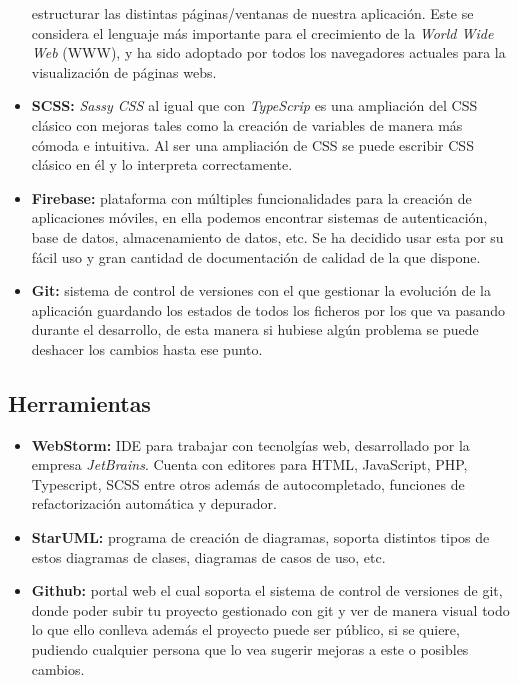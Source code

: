\begin{itemize}
    estructurar las distintas páginas/ventanas de nuestra aplicación. Este se considera el lenguaje
    más importante para el crecimiento de la \textit{World Wide Web} (WWW), y ha sido adoptado por
    todos los navegadores actuales para la visualización de páginas webs.
    \item\textbf{SCSS:} \textit{Sassy CSS} al igual que con \textit{TypeScrip} es una ampliación del
    CSS clásico con mejoras tales como la creación de variables de manera más cómoda e intuitiva.
    Al ser una ampliación de CSS se puede escribir CSS clásico en él y lo interpreta correctamente.
    \item\textbf{Firebase:} plataforma con múltiples funcionalidades para la creación de aplicaciones
    móviles, en ella podemos encontrar sistemas de autenticación, base de datos, almacenamiento de
    datos, etc. Se ha decidido usar esta por su fácil uso y gran cantidad de documentación de calidad
    de la que dispone.
    \item\textbf{Git:} sistema de control de versiones con el que gestionar la evolución de la
    aplicación guardando los estados de todos los ficheros por los que va pasando durante el
    desarrollo, de esta manera si hubiese algún problema se puede deshacer los cambios hasta ese
    punto.
\end{itemize}

\subsection{Herramientas}
\begin{itemize}
    \item\textbf{WebStorm:} IDE para trabajar con tecnolgías web, desarrollado por la empresa
    \textit{JetBrains}\cite{jetbrains}. Cuenta con editores para HTML, JavaScript, PHP,
    Typescript, SCSS entre otros además de autocompletado, funciones de refactorización
    automática y depurador.
    \item\textbf{StarUML:} programa de creación de diagramas, soporta distintos tipos de estos
    diagramas de clases, diagramas de casos de uso, etc.
    \item\textbf{Github:} portal web el cual soporta el sistema de control de versiones de git,
    donde poder subir tu proyecto gestionado con git y ver de manera visual todo lo que ello conlleva
    además el proyecto puede ser público, si se quiere, pudiendo cualquier persona que lo vea
    sugerir mejoras a este o posibles cambios.
\end{itemize}

